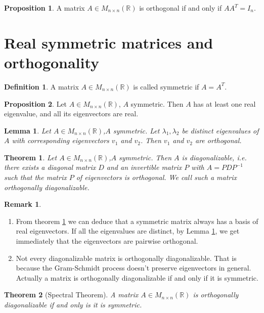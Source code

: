 \documentclass[11pt,a4paper]{article}
\newcommand\R{\mathbb{R}}
\newcommand\inMatrixSq{\in M_{n \times n} (\R)}
\newtheorem{lemma}{Lemma}
\newtheorem{theorem}{Theorem}
\theoremstyle{definition}
\newtheorem{definition}{Definition}
\newtheorem{proposition}{Proposition}
\newtheorem{remark}{Remark}
\begin{document}
\begin{proposition}
    A matrix $ A \inMatrixSq $ is orthogonal if and only if $ AA^T = I_n $.
\end{proposition}

\section{Real symmetric matrices and orthogonality}

\begin{definition}
    A matrix $ A \inMatrixSq $ is called symmetric if $ A = A^T $.
\end{definition}

\begin{proposition}
    Let $ A \inMatrixSq $, $ A $ symmetric. Then $ A $ has at least one real eigenvalue, and all its eigenvectors are real.
\end{proposition}

\begin{lemma}
    Let $ A \inMatrixSq $,$ A $ symmetric. Let $ \lambda_1, \lambda_2 $ be distinct eigenvalues of $ A $ with corresponding eigenvectors $ v_1 $ and $ v_2 $. Then $ v_1 $ and $ v_2 $ are orthogonal.
    \label{orthogonalEigenvectors}
\end{lemma}

\begin{theorem}
    Let $ A \inMatrixSq $,$ A $ symmetric. Then $ A $ is diagonalizable, i.e. there exists a diagonal matrix $ D $ and an invertible matrix $ P $ with
    $ A = PDP^{-1} $ such that the matrix $P$ of eigenvectors is orthogonal. We call such a matrix orthogonally diagonalizable.
    \label{orthogonallyDiag}
\end{theorem}

\begin{remark}
    \begin{enumerate}
        \item From theorem \ref{orthogonallyDiag} we can deduce that a symmetric matrix always has a basis of real eigenvectors. If all the eigenvalues are distinct, by 
        Lemma \ref{orthogonalEigenvectors}, we get immediately that the eigenvectors are pairwise orthogonal.
        \item Not every diagonalizable matrix is orthogonally diagonalizable. That is because the Gram-Schmidt process doesn't preserve eigenvectors in general. 
        Actually a matrix is orthogonally diagonalizable if and only if it is symmetric.
    \end{enumerate}
\end{remark}

\begin{theorem}[Spectral Theorem]
    A matrix $ A \inMatrixSq $ is orthogonally diagonalizable if and only is it is symmetric.
\end{theorem}
\end{document}
